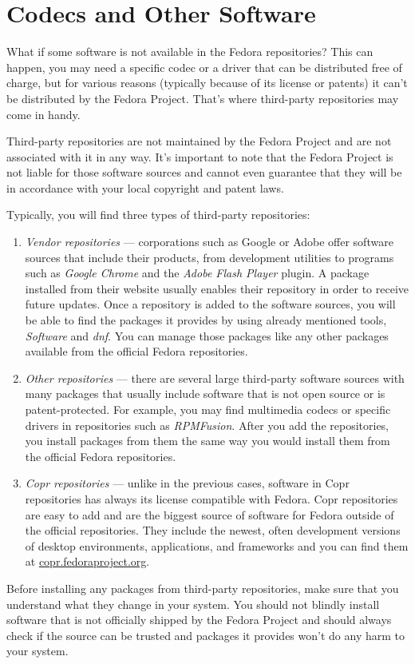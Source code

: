\section*{Codecs and Other Software}

What if some software is not available in the Fedora repositories? This can happen, you may need a specific codec or a driver that can be distributed free of charge, but for various reasons (typically because of its license or patents) it can't be distributed by the Fedora Project. That's where third-party repositories may come in handy.

Third-party repositories are not maintained by the Fedora Project and are not associated with it in any way. It's important to note that the Fedora Project is not liable for those software sources and cannot even guarantee that they will be in accordance with your local copyright and patent laws.

Typically, you will find three types of third-party repositories:
\begin{enumerate}
\item\emph{Vendor repositories} --- corporations such as Google or Adobe offer software sources that include their products, from development utilities to programs such as \emph{Google Chrome} and the \emph{Adobe Flash Player} plugin. A package installed from their website usually enables their repository in order to receive future updates. Once a repository is added to the software sources, you will be able to find the packages it provides by using already mentioned tools, \emph{Software} and \emph{dnf}. You can manage those packages like any other packages available from the official Fedora repositories.

\item\emph{Other repositories} --- there are several large third-party software sources with many packages that usually include software that is not open source or is patent-protected. For example, you may find multimedia codecs or specific drivers in repositories such as \emph{RPMFusion}. After you add the repositories, you install packages from them the same way you would install them from the official Fedora repositories.

\item\emph{Copr repositories} --- unlike in the previous cases, software in Copr repositories has always its license compatible with Fedora. Copr repositories are easy to add and are the biggest source of software for Fedora outside of the official repositories. They include the newest, often development versions of desktop environments, applications, and frameworks and you can find them at \url{copr.fedoraproject.org}.
\end{enumerate}

Before installing any packages from third-party repositories, make sure that you understand what they change in your system. You should not blindly install software that is not officially shipped by the Fedora Project and should always check if the source can be trusted and packages it provides won't do any harm to your system.

\endinput
